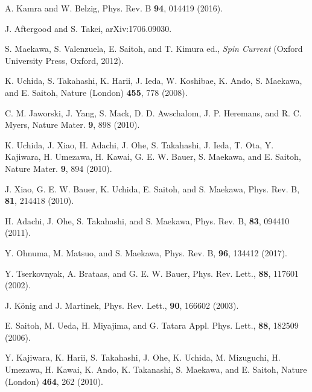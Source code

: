 \documentclass[aps,prl,reprint,showpacs]{revtex4-1}
\begin{document}
\begin{thebibliography}{10}
A. Kamra and W. Belzig, Phys. Rev. B {\bf 94}, 014419 (2016).

J. Aftergood and S. Takei, arXiv:1706.09030.

S. Maekawa, S. Valenzuela, E. Saitoh, and T. Kimura ed., {\it Spin Current} (Oxford University Press, Oxford, 2012).

K. Uchida, S. Takahashi, K. Harii, J. Ieda, W. Koshibae, K. Ando, S. Maekawa, and E. Saitoh, 
Nature (London) {\bf 455}, 778 (2008). 

C. M. Jaworski, J. Yang, S. Mack, D. D. Awschalom, J. P. Heremans, and R. C. Myers, 
Nature Mater. {\bf 9}, 898 (2010). 
    
K. Uchida, J. Xiao, H. Adachi, J. Ohe, S. Takahashi, J. Ieda, T. Ota, Y. Kajiwara, H. Umezawa, H. Kawai, G. E. W. Bauer, S. Maekawa, and E. Saitoh, 
Nature Mater. {\bf 9}, 894 (2010).

J. Xiao, G. E. W. Bauer, K. Uchida, E. Saitoh, and S. Maekawa, 
Phys. Rev. B, {\bf 81}, 214418 (2010). 

H. Adachi, J. Ohe, S. Takahashi, and S. Maekawa, 
Phys. Rev. B, {\bf 83}, 094410 (2011).

Y. Ohnuma, M. Matsuo, and S. Maekawa, 
Phys. Rev. B, {\bf 96}, 134412 (2017).

Y. Tserkovnyak, A. Brataas, and G. E. W. Bauer,
Phys. Rev. Lett., {\bf 88}, 117601 (2002).

J. K\"onig and J. Martinek, Phys. Rev. Lett., {\bf 90}, 166602 (2003). 

E. Saitoh, M. Ueda, H. Miyajima, and G. Tatara
Appl. Phys. Lett., {\bf 88}, 182509 (2006).

Y. Kajiwara, K. Harii, S. Takahashi, J. Ohe, K. Uchida, M. Mizuguchi, H. Umezawa, H. Kawai, K. Ando, K. Takanashi, S. Maekawa, and E. Saitoh, 
Nature (London) {\bf 464}, 262 (2010).


\end{thebibliography}
\end{document}
